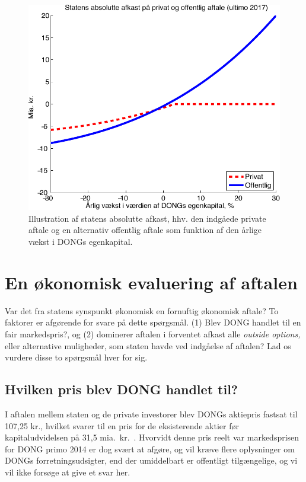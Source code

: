 \documentclass{article}
\begin{document}
\begin{figure}
\centerline{\includegraphics[scale=0.8]{../matlab/figs/private_public_deal_guan}}
\caption{Illustration af statens absolutte afkast, hhv. den indg\aa{}ede private aftale og en alternativ offentlig aftale som funktion af den \aa{}rlige v\ae{}kst i DONGs egenkapital. }
\label{fig:privat_off}
\end{figure}


\section{En økonomisk evaluering af aftalen}

Var det fra statens synspunkt økonomisk en fornuftig økonomisk aftale? To faktorer er afgørende for svare på dette spørgsmål. (1) Blev DONG handlet til en fair markedspris?, og (2) dominerer aftalen i forventet afkast  alle \emph{outside options,} eller alternative muligheder, som staten havde ved indgåelse af aftalen? Lad os vurdere disse to spørgsmål hver for sig.

\subsection{Hvilken pris blev DONG handlet til?}

I aftalen mellem staten og de private investorer blev  DONGs aktiepris fastsat til 107,25 kr., hvilket svarer til en pris for de eksisterende aktier før kapitaludvidelsen på 31,5 mia.\ kr.\ \citep{FM2013a}. Hvorvidt denne pris reelt var markedsprisen for DONG primo 2014 er dog svært at afgøre, og vil kræve flere oplysninger om DONGs forretningsudsigter, end der umiddelbart er offentligt tilgængelige, og vi vil ikke forsøge at give et svar her. 
\end{document}
